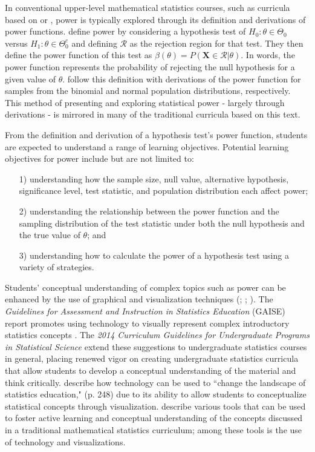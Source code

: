 \documentclass{TISE}
\begin{document}
In conventional upper-level mathematical statistics courses, such as curricula based on \citet{wackerly2008} or \citet{casella2002}, power is typically explored through its definition and derivations of power functions. \cite{casella2002} define power by considering a hypothesis test of $H_0 : \theta \in \Theta_0$ versus $H_1 : \theta \in \Theta_0^c$ and defining $\mathcal{R}$ as the rejection region for that test. They then define the power function of this test as $\beta(\theta) = P(\boldsymbol{X} \in \mathcal{R} | \theta)$. In words, the power function represents the probability of rejecting the null hypothesis for a given value of $\theta$. \cite{casella2002} follow this definition with derivations of the power function for samples from the binomial and normal population distributions, respectively. This method of presenting and exploring statistical power - largely through derivations - is mirrored in many of the traditional curricula based on this text. 

From the definition and derivation of a hypothesis test's power function, students are expected to understand a range of learning objectives. Potential learning objectives for power include but are not limited to:
\begin{itemize}
	\item[1)] understanding how the sample size, null value, alternative hypothesis, significance level, test statistic, and population distribution each affect power;
	\item[2)] understanding the relationship between the power function and the sampling distribution of the test statistic under both the null hypothesis and the true value of $\theta$; and
	\item[3)] understanding how to calculate the power of a hypothesis test using a variety of strategies.
\end{itemize}

Students' conceptual understanding of complex topics such as power can be enhanced by the use of graphical and visualization techniques (\citealt{delMas1999}; \citealt{chance2007}; \citealt{bobek2016}). The \textit{Guidelines for Assessment and Instruction in Statistics Education} (GAISE) report promotes using technology to visually represent complex introductory statistics concepts \citep{ASA2016}. The \textit{2014 Curriculum Guidelines for Undergraduate Programs in Statistical Science} \citep{ASA2014} extend these suggestions to undergraduate statistics courses in general, placing renewed vigor on creating undergraduate statistics curricula that allow students to develop a conceptual understanding of the material and think critically. \cite{wild2011} describe how technology can be used to ``change the landscape of statistics education," (p. 248) due to its ability to allow students to conceptualize statistical concepts through visualization. \cite{green2015} describe various tools that can be used to foster active learning and conceptual understanding of the concepts discussed in a traditional mathematical statistics curriculum; among these tools is the use of technology and visualizations. 
\end{document}
